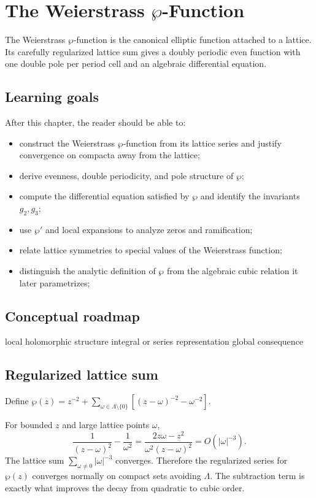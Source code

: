\chapter{The Weierstrass $\wp$-Function}
\label{ch:iv29}

The Weierstrass $\wp$-function is the canonical elliptic function attached to a lattice. Its carefully regularized lattice sum gives a doubly periodic even function with one double pole per period cell and an algebraic differential equation.

\section*{Learning goals}
After this chapter, the reader should be able to:
\begin{itemize}
\item construct the Weierstrass \(\wp\)-function from its lattice series and justify convergence on compacta away from the lattice;
\item derive evenness, double periodicity, and pole structure of \(\wp\);
\item compute the differential equation satisfied by \(\wp\) and identify the invariants \(g_2,g_3\);
\item use \(\wp'\) and local expansions to analyze zeros and ramification;
\item relate lattice symmetries to special values of the Weierstrass function;
\item distinguish the analytic definition of \(\wp\) from the algebraic cubic relation it later parametrizes;
\end{itemize}
\section*{Conceptual roadmap}
\volroadmap
  {local holomorphic structure}
  {integral or series representation}
  {global consequence}

\section{Regularized lattice sum}
Define $\wp(z)=z^{-2}+\sum_{\omega\in\Lambda\setminus\{0\}}[(z-\omega)^{-2}-\omega^{-2}]$.

\begin{example}\label{ex:iv29-expand-01}
For bounded \(z\) and large lattice points \(\omega\),
\[
\frac1{(z-\omega)^2}-\frac1{\omega^2}
=\frac{2z\omega-z^2}{\omega^2(z-\omega)^2}
=O(|\omega|^{-3}).
\]
The lattice sum \(\sum_{\omega\ne0}|\omega|^{-3}\) converges. Therefore the regularized series for \(\wp(z)\) converges normally on compact sets avoiding \(\Lambda\). The subtraction term is exactly what improves the decay from quadratic to cubic order.
\end{example}
